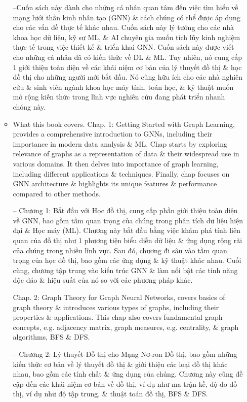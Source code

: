 \documentclass{article}
\begin{document}
\begin{itemize}
\begin{itemize}
        --Cuốn sách này dành cho những cá nhân quan tâm đến việc tìm hiểu về mạng lưới thần kinh nhân tạo (GNN) \& cách chúng có thể được áp dụng cho các vấn đề thực tế khác nhau. Cuốn sách này lý tưởng cho các nhà khoa học dữ liệu, kỹ sư ML, \& AI chuyên gia muốn tích lũy kinh nghiệm thực tế trong việc thiết kế \& triển khai GNN. Cuốn sách này được viết cho những cá nhân đã có kiến thức về DL \& ML. Tuy nhiên, nó cung cấp 1 giới thiệu toàn diện về các khái niệm cơ bản của lý thuyết đồ thị \& học đồ thị cho những người mới bắt đầu. Nó cũng hữu ích cho các nhà nghiên cứu \& sinh viên ngành khoa học máy tính, toán học, \& kỹ thuật muốn mở rộng kiến thức trong lĩnh vực nghiên cứu đang phát triển nhanh chóng này.
        \item {\sf What this book covers.} Chap. 1: Getting Started with Graph Learning, provides a comprehensive introduction to GNNs, including their importance in modern data analysis \& ML. Chap starts by exploring relevance of graphs as a representation of data \& their widespread use in various domains. It then delves into importance of graph learning, including different applications \& techniques. Finally, chap focuses on GNN architecture \& highlights its unique features \& performance compared to other methods.

        -- Chương 1: Bắt đầu với Học đồ thị, cung cấp phần giới thiệu toàn diện về GNN, bao gồm tầm quan trọng của chúng trong phân tích dữ liệu hiện đại \& Học máy (ML). Chương này bắt đầu bằng việc khám phá tính liên quan của đồ thị như 1 phương tiện biểu diễn dữ liệu \& ứng dụng rộng rãi của chúng trong nhiều lĩnh vực. Sau đó, chương đi sâu vào tầm quan trọng của học đồ thị, bao gồm các ứng dụng \& kỹ thuật khác nhau. Cuối cùng, chương tập trung vào kiến trúc GNN \& làm nổi bật các tính năng độc đáo \& hiệu suất của nó so với các phương pháp khác.

        Chap. 2: Graph Theory for Graph Neural Networks, covers basics of graph theory \& introduces various types of graphs, including their properties \& applications. This chap also covers fundamental graph concepts, e.g. adjacency matrix, graph measures, e.g. centrality, \& graph algorithms, BFS \& DFS.

        -- Chương 2: Lý thuyết Đồ thị cho Mạng Nơ-ron Đồ thị, bao gồm những kiến thức cơ bản về lý thuyết đồ thị \& giới thiệu các loại đồ thị khác nhau, bao gồm các tính chất \& ứng dụng của chúng. Chương này cũng đề cập đến các khái niệm cơ bản về đồ thị, ví dụ như ma trận kề, độ đo đồ thị, ví dụ như độ tập trung, \& thuật toán đồ thị, BFS \& DFS.


\end{itemize}
\end{itemize}
\end{document}
